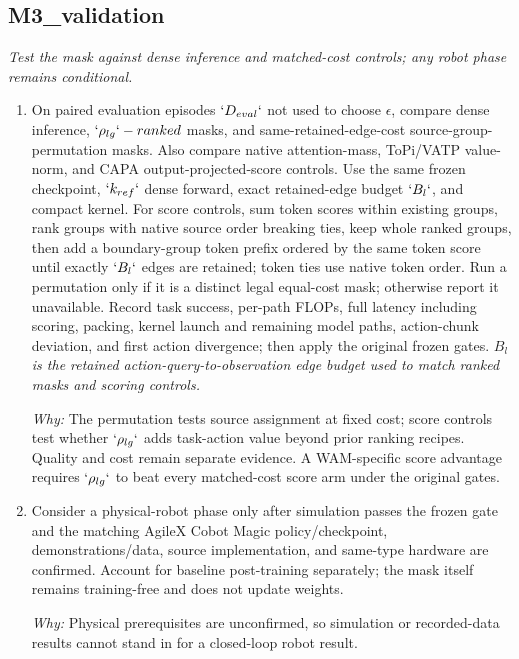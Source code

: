 \documentclass[10pt,a4paper]{article}
\begin{document}
\subsection*{M3\_validation}
\emph{Test the mask against dense inference and matched-cost controls;\allowbreak{} any robot phase remains conditional.}
\begin{enumerate}[leftmargin=*,start=6]
  \item On paired evaluation episodes \(`D_{eval}`\) not used to choose \(\epsilon \), compare dense inference, \(`\rho _{lg}`-ranked\) masks, and same-retained-edge-cost source-group-permutation masks. Also compare native attention-mass, ToPi/VATP value-norm, and CAPA output-projected-score controls. Use the same frozen checkpoint, \(`k_{ref}`\) dense forward, exact retained-edge budget \(`B_{l}`\), and compact kernel. For score controls, sum token scores within existing groups, rank groups with native source order breaking ties, keep whole ranked groups, then add a boundary-group token prefix ordered by the same token score until exactly \(`B_{l}`\) edges are retained;\allowbreak{} token ties use native token order. Run a permutation only if it is a distinct legal equal-cost mask;\allowbreak{} otherwise report it unavailable. Record task success, per-path FLOPs, full latency including scoring, packing, kernel launch and remaining model paths, action-chunk deviation, and first action divergence;\allowbreak{} then apply the original frozen gates.
\noindent\emph{\(B_{l}\) is the retained action-query-to-observation edge budget used to match ranked masks and scoring controls.}
\par{}
\par\emph{Why:} The permutation tests source assignment at fixed cost;\allowbreak{} score controls test whether \(`\rho _{lg}`\) adds task-action value beyond prior ranking recipes. Quality and cost remain separate evidence. A WAM-specific score advantage requires \(`\rho _{lg}`\) to beat every matched-cost score arm under the original gates.
  \item Consider a physical-robot phase only after simulation passes the frozen gate and the matching AgileX Cobot Magic policy/checkpoint, demonstrations/data, source implementation, and same-type hardware are confirmed. Account for baseline post-training separately;\allowbreak{} the mask itself remains training-free and does not update weights.
\par\emph{Why:} Physical prerequisites are unconfirmed, so simulation or recorded-data results cannot stand in for a closed-loop robot result.
\end{enumerate}
\end{document}
